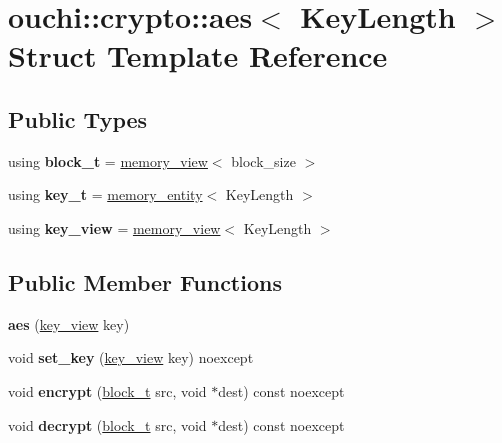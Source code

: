 \hypertarget{structouchi_1_1crypto_1_1aes}{}\section{ouchi\+::crypto\+::aes$<$ Key\+Length $>$ Struct Template Reference}
\label{structouchi_1_1crypto_1_1aes}
\subsection*{Public Types}
\begin{DoxyCompactItemize}
\item 
\mbox{\label{structouchi_1_1crypto_1_1aes_a6af126b193761dd1d5edc2193843e306}} 
using {\bfseries block\+\_\+t} = \mbox{\hyperlink{classouchi_1_1crypto_1_1memory__view}{memory\+\_\+view}}$<$ block\+\_\+size $>$
\item 
\mbox{\label{structouchi_1_1crypto_1_1aes_adfb5460709cd46fbb5021e023c8e780a}} 
using {\bfseries key\+\_\+t} = \mbox{\hyperlink{structouchi_1_1crypto_1_1memory__entity}{memory\+\_\+entity}}$<$ Key\+Length $>$
\item 
\mbox{\label{structouchi_1_1crypto_1_1aes_a867e7dc5f1e7e22a74712b09c409476e}} 
using {\bfseries key\+\_\+view} = \mbox{\hyperlink{classouchi_1_1crypto_1_1memory__view}{memory\+\_\+view}}$<$ Key\+Length $>$
\end{DoxyCompactItemize}
\subsection*{Public Member Functions}
\begin{DoxyCompactItemize}
\item 
\mbox{\label{structouchi_1_1crypto_1_1aes_a2a354f196004098103327377fe7d4602}} 
{\bfseries aes} (\mbox{\hyperlink{classouchi_1_1crypto_1_1memory__view}{key\+\_\+view}} key)
\item 
\mbox{\label{structouchi_1_1crypto_1_1aes_a20bc0ab55648cab1c3458e0a7355e6ef}} 
void {\bfseries set\+\_\+key} (\mbox{\hyperlink{classouchi_1_1crypto_1_1memory__view}{key\+\_\+view}} key) noexcept
\item 
\mbox{\label{structouchi_1_1crypto_1_1aes_aeaf823dfc7c42ae0ac9b091fe9fe6493}} 
void {\bfseries encrypt} (\mbox{\hyperlink{classouchi_1_1crypto_1_1memory__view}{block\+\_\+t}} src, void $\ast$dest) const noexcept
\item 
\mbox{\label{structouchi_1_1crypto_1_1aes_ae85c47d6be8cb8a7138dfe3c3ee43757}} 
void {\bfseries decrypt} (\mbox{\hyperlink{classouchi_1_1crypto_1_1memory__view}{block\+\_\+t}} src, void $\ast$dest) const noexcept
\end{DoxyCompactItemize}
